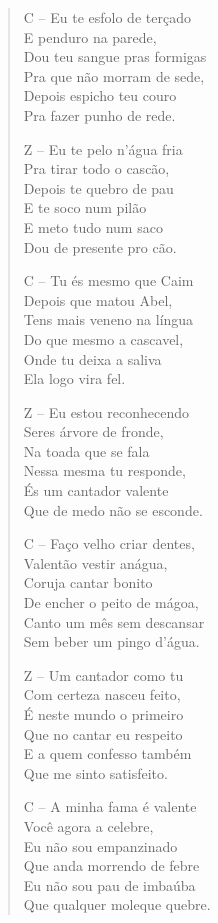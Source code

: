 \begin{verse}
C – Eu te esfolo de terçado\\
E penduro na parede,\\
Dou teu sangue pras formigas\\
Pra que não morram de sede,\\
Depois espicho teu couro\\
Pra fazer punho de rede.

Z – Eu te pelo n’água fria\\
Pra tirar todo o cascão,\\
Depois te quebro de pau\\
E te soco num pilão\\
E meto tudo num saco\\
Dou de presente pro cão.

C – Tu és mesmo que Caim\\
Depois que matou Abel,\\
Tens mais veneno na língua\\
Do que mesmo a cascavel,\\
Onde tu deixa a saliva\\
Ela logo vira fel.


Z – Eu estou reconhecendo\\
Seres árvore de fronde,\\
Na toada que se fala\\
Nessa mesma tu responde,\\
És um cantador valente\\
Que de medo não se esconde.

C – Faço velho criar dentes, \\
Valentão vestir anágua,\\
Coruja cantar bonito\\
De encher o peito de mágoa,\\
Canto um mês sem descansar\\
Sem beber um pingo d’água.

Z – Um cantador como tu\\
Com certeza nasceu feito,\\
É neste mundo o primeiro\\
Que no cantar eu respeito\\
E a quem confesso também\\
Que me sinto satisfeito.

C – A minha fama é valente\\
Você agora a celebre, \\
Eu não sou empanzinado\\
Que anda morrendo de febre\\
Eu não sou pau de imbaúba\\
Que qualquer moleque quebre.



\end{verse}
